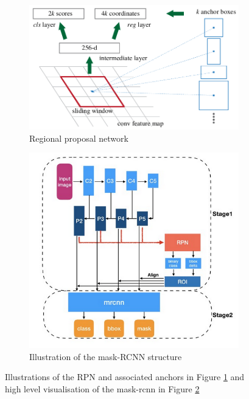 \documentclass[../Head/Main.tex]{subfiles}
\begin{document}
\begin{figure}[H]
    \centering
    \begin{subfigure}[t]{.56\textwidth}
        \centering
        \includegraphics[width=\textwidth]{../Figures/deep_learning_algorithms/RPN.png}
        \caption{Regional proposal network \cite{FasterRCNN}}
        \label{fig:RPN}
    \end{subfigure}
        \begin{subfigure}[t]{.42\textwidth}
        \centering
        \includegraphics[width=\textwidth]{../Figures/deep_learning_algorithms/mask_rcnn_structure.png}
        \caption{Illustration of the mask-RCNN structure \cite{MaskRCNNStructure}}
        \label{fig:mask_rcnn_structure}
    \end{subfigure}
    \caption{Illustrations of the RPN and associated anchors in Figure \ref{fig:RPN} and high level visualisation of the mask-rcnn in Figure \ref{fig:mask_rcnn_structure}}
     \label{fig:RPN_mask_rcnn}
\end{figure}
\end{document}
